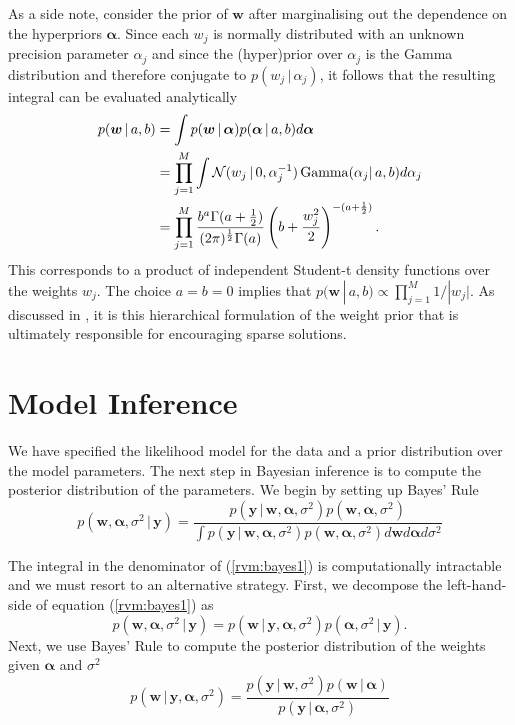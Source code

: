 As a side note, consider the prior of $\bm w$ after marginalising out the dependence on the hyperpriors $\bm\alpha$.
Since each $w_j$ is normally distributed with an unknown precision parameter $\alpha_j$ and since the (hyper)prior over $\alpha_j$ is the Gamma distribution and therefore conjugate to $p(w_j\,|\,\alpha_j)$, it follows that the resulting integral can be evaluated analytically
\begin{equation*}
  \begin{split}
    p(\bm w\,|\,a,b) &= \int p(\bm w\,|\,\bm\alpha) p(\bm\alpha\,|\,a,b)d\bm\alpha\\
    &= \prod_{j=1}^M \int \mathcal{N}(w_j\,|\,0,\alpha_j^{-1}) \operatorname*{Gamma}(\alpha_j|\,a,b)d\alpha_j\\
    &= \prod_{j=1}^M \frac{b^a\Gamma(a+\frac{1}{2})}{(2\pi)^{\frac{1}{2}}\Gamma(a)}\left(b+\frac{w_j^2}{2}\right)^{-(a+\frac{1}{2})}.
\end{split}
\end{equation*}
This corresponds to a product of independent Student-t density functions over the weights $w_j$.
The choice $a=b=0$ implies that $p(\bm w \,|\,a,b) \propto \prod_{j=1}^M 1/|w_j|$.
As discussed in \cite{tipping2001}, it is this hierarchical formulation of the weight prior that is ultimately responsible for encouraging sparse solutions.


\section{Model Inference}
We have specified the likelihood model for the data and a prior distribution over the model parameters.
The next step in Bayesian inference is to compute the posterior distribution of the parameters.
We begin by setting up Bayes' Rule
\begin{equation}
\label{rvm:bayes1}
  p(\bm w, \bm \alpha, \sigma^2 \,|\,\bm y) = \frac{p(\bm y \,|\, \bm w, \bm \alpha, \sigma^2) p(\bm w, \bm \alpha, \sigma^2)}
  {\int p(\bm y \,|\, \bm w, \bm \alpha, \sigma^2) p(\bm w, \bm \alpha, \sigma^2)d\bm w d\bm \alpha d\sigma^2}
\end{equation}

The integral in the denominator of (\ref{rvm:bayes1}) is computationally intractable and we must resort to an alternative strategy.
First, we decompose the left-hand-side of equation (\ref{rvm:bayes1}) as
\begin{equation*}
  p(\bm w, \bm \alpha, \sigma^2\,|\,\bm y) = p(\bm w\,|\,\bm y, \bm \alpha, \sigma^2) p(\bm\alpha,\sigma^2\,|\,\bm y).
\end{equation*}
Next, we use Bayes' Rule to compute the posterior distribution of the weights given $\bm\alpha$ and $\sigma^2$
\begin{equation}
  \label{rvm:bayes2}
  p(\bm w\,|\,\bm y, \bm \alpha, \sigma^2) = \frac{p(\bm y\,|\,\bm w,\sigma^2) p(\bm w\,|\,\bm \alpha)}{p(\bm y\,|\,\bm\alpha,\sigma^2)}
\end{equation}

